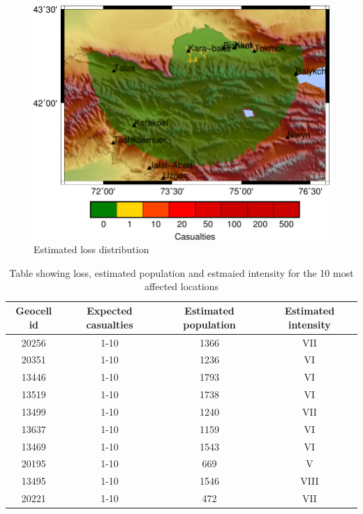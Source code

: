 \documentclass{article}
\begin{document}
\begin{figure}[h!]
\centering
\includegraphics[width=12cm]{social.pdf}
\caption{Estimated loss distribution}
\label{fat_fig}
\end{figure}


\begin{table}[h!]
\caption{Table showing loss, estimated population and estmaied intensity for the 10 most affected locations}
\label{fat_table}
\begin{tabular}{c|c|c|c}
\hline
Geocell id&Expected casualties&Estimated population&Estimated intensity\\
\hline
20256 & 1-10 & 1366 & VII \\
20351 & 1-10 & 1236 & VI \\
13446 & 1-10 & 1793 & VI \\
13519 & 1-10 & 1738 & VI \\
13499 & 1-10 & 1240 & VII \\
13637 & 1-10 & 1159 & VI \\
13469 & 1-10 & 1543 & VI \\
20195 & 1-10 & 669 & V \\
13495 & 1-10 & 1546 & VIII \\
20221 & 1-10 & 472 & VII \\
\hline
\end{tabular}
\end{table}
\end{document}
